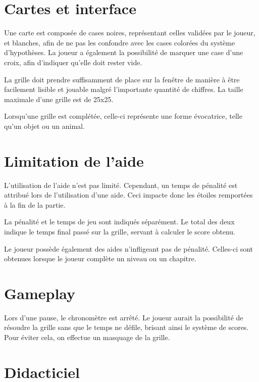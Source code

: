 \documentclass[a4paper, 12pt]{report}
\begin{document}
	\section{Cartes et interface}
	\vspace*{0.2cm}
	
		Une carte est composée de cases noires, représentant celles validées par le joueur, et blanches, afin de ne pas les confondre avec les cases colorées du système d'hypothèses.
		La joueur a également la possibilité de marquer une case d'une croix, afin d'indiquer qu'elle doit rester vide.
		
		La grille doit prendre suffisamment de place sur la fenêtre de manière à être facilement lisible et jouable malgré l'importante quantité de chiffres. La taille maximale d'une grille est de 25x25.
		
		Lorsqu'une grille est complétée, celle-ci représente une forme évocatrice, telle qu'un objet ou un animal.

	
	\section{Limitation de l'aide}
	\vspace*{0.2cm}
	
		L'utilisation de l'aide n'est pas limité. Cependant, un temps de pénalité est attribué lors de l'utilisation d'une aide. Ceci impacte donc les étoiles remportées à la fin de la partie. 
		
		La pénalité et le temps de jeu sont indiqués séparément. Le total des deux indique le temps final passé sur la grille, servant à calculer le score obtenu. 
		
		Le joueur possède également des aides n'infligeant pas de pénalité. Celles-ci sont obtenues lorsque le joueur complète un niveau ou un chapitre.
	
	\section{Gameplay}
	\vspace*{0.2cm}
	
		Lors d'une pause, le chronomètre est arrêté. Le joueur aurait la possibilité de résoudre la grille sans que le temps ne défile, brisant ainsi le système de scores. 
		Pour éviter cela, on effectue un masquage de la grille.
		
	\section{Didacticiel}
	\vspace*{0.2cm}
	
\end{document}
